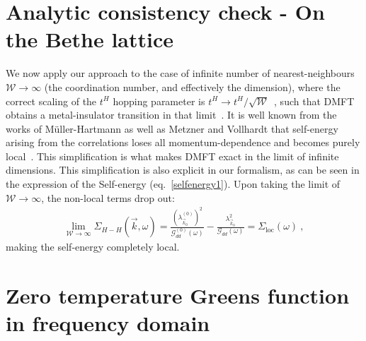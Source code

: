 \documentclass[prb]{revtex4-2}
\begin{document}
\section{Analytic consistency check - On the Bethe lattice}
We now apply our approach to the case of infinite number of nearest-neighbours $\mathcal{W}\to\infty$ (the coordination number, and effectively the dimension), where the correct scaling of the $t^{H}$ hopping parameter is $t^{H}\to t^{H}/\sqrt{\mathcal{W}}$~\cite{metzner_volhardt_1989,georges_kotliar_1992,pruschke_cox_jarrel_1993}, such that DMFT obtains a metal-insulator transition in that limit~\cite{georges1996}. It is well known from the works of Müller-Hartmann as well as Metzner and Vollhardt that self-energy arising from the correlations loses all momentum-dependence and becomes purely local~\cite{Muller-Hartmann1989,metzner_volhardt_1989}. This simplification is what makes DMFT exact in the limit of infinite dimensions. This simplification is also explicit in our formalism, as can be seen in the expression of the Self-energy (eq.~\eqref{selfenergy1}). Upon taking the limit of \(\mathcal{W}\to\infty\), the non-local terms drop out:
\begin{equation}\begin{aligned}
	\lim_{\mathcal{W}\to\infty}\Sigma_{H-H}(\vec k,\omega) = \frac{\left(\lambda_{\vec k_0}^{(0)}\right)^2}{\mathcal{G}^{(0)}_{dd}(\omega)} - \frac{\lambda_{\vec k_0}^2}{\mathcal{G}_{dd}(\omega)} = \Sigma_\text{loc}(\omega)~,
\end{aligned}\end{equation}
making the self-energy completely local.

\appendix

\section{Zero temperature Greens function in frequency domain}
\end{document}
